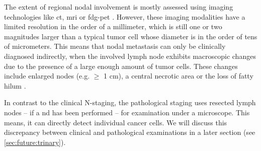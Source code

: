 \documentclass[\relativeRoot/main.tex]{subfiles}
\begin{document}
The extent of regional nodal involvement is mostly assessed using imaging technologies like \gls{ct}, \gls{mri} or \gls{fdg-pet} \cite{johnson_head_2020,van_den_bosch_18f-fdg-petct-based_2020}. However, these imaging modalities have a limited resolution in the order of a millimeter, which is still one or two magnitudes larger than a typical tumor cell whose diameter is in the order of tens of micrometers. This means that nodal metastasis can only be clinically diagnosed indirectly, when the involved lymph node exhibits macroscopic changes due to the presence of a large enough amount of tumor cells. These changes include enlarged nodes (e.g. $\geq$ 1 cm), a central necrotic area or the loss of fatty hilum \cite{pillsbury_iii_rationale_1997,biau_selection_2019,ludwig_dataset_2021}.

In contrast to the clinical N-staging, the pathological staging uses resected lymph nodes -- if a \acrlong{nd} has been performed -- for examination under a microscope. This means, it can directly detect individual cancer cells. We will discuss this discrepancy between clinical and pathological examinations in a later section (see \cref{sec:future:trinary}).
\end{document}
